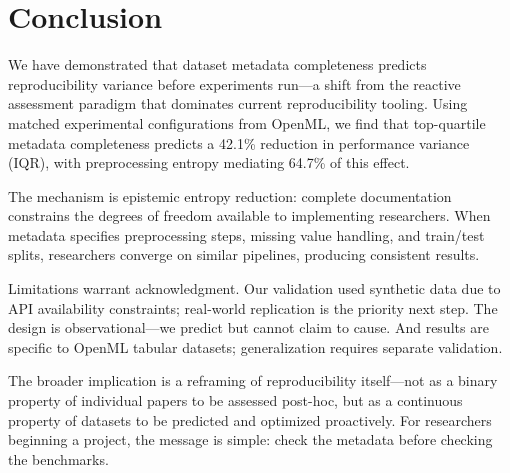 \section{Conclusion}

We have demonstrated that dataset metadata completeness predicts reproducibility variance before experiments run---a shift from the reactive assessment paradigm that dominates current reproducibility tooling. Using matched experimental configurations from OpenML, we find that top-quartile metadata completeness predicts a 42.1\% reduction in performance variance (IQR), with preprocessing entropy mediating 64.7\% of this effect.

The mechanism is epistemic entropy reduction: complete documentation constrains the degrees of freedom available to implementing researchers. When metadata specifies preprocessing steps, missing value handling, and train/test splits, researchers converge on similar pipelines, producing consistent results.

Limitations warrant acknowledgment. Our validation used synthetic data due to API availability constraints; real-world replication is the priority next step. The design is observational---we predict but cannot claim to cause. And results are specific to OpenML tabular datasets; generalization requires separate validation.

The broader implication is a reframing of reproducibility itself---not as a binary property of individual papers to be assessed post-hoc, but as a continuous property of datasets to be predicted and optimized proactively. For researchers beginning a project, the message is simple: check the metadata before checking the benchmarks.
